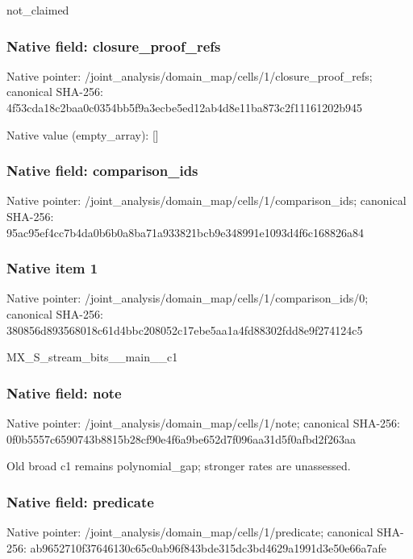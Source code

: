 \documentclass[10pt,a4paper]{article}
\begin{document}
\begingroup\raggedright\sloppy not\_\allowbreak{}claimed\par\endgroup

\subsubsection{Native field: closure\_\allowbreak{}proof\_\allowbreak{}refs}
Native pointer: /joint\_\allowbreak{}analysis/domain\_\allowbreak{}map/cells/1/closure\_\allowbreak{}proof\_\allowbreak{}refs; canonical SHA-256: 4f53cda18c2baa0c0354bb5f9a3ecbe5ed12ab4d8e11ba873c2f11161202b945

Native value (empty\_\allowbreak{}array): []

\subsubsection{Native field: comparison\_\allowbreak{}ids}
Native pointer: /joint\_\allowbreak{}analysis/domain\_\allowbreak{}map/cells/1/comparison\_\allowbreak{}ids; canonical SHA-256: 95ac95ef4cc7b4da0b6b0a8ba71a933821bcb9e348991e1093d4f6c168826a84

\subsubsection{Native item 1}
Native pointer: /joint\_\allowbreak{}analysis/domain\_\allowbreak{}map/cells/1/comparison\_\allowbreak{}ids/0; canonical SHA-256: 380856d893568018c61d4bbc208052c17ebe5aa1a4fd88302fdd8e9f274124c5

\begingroup\raggedright\sloppy MX\_\allowbreak{}S\_\allowbreak{}stream\_\allowbreak{}bits\_\allowbreak{}\_\allowbreak{}main\_\allowbreak{}\_\allowbreak{}c1\par\endgroup

\subsubsection{Native field: note}
Native pointer: /joint\_\allowbreak{}analysis/domain\_\allowbreak{}map/cells/1/note; canonical SHA-256: 0f0b5557c6590743b8815b28cf90e4f6a9be652d7f096aa31d5f0afbd2f263aa

\begingroup\raggedright\sloppy Old broad c1 remains polynomial\_\allowbreak{}gap;\allowbreak{} stronger rates are unassessed.\par\endgroup

\subsubsection{Native field: predicate}
Native pointer: /joint\_\allowbreak{}analysis/domain\_\allowbreak{}map/cells/1/predicate; canonical SHA-256: ab9652710f37646130c65c0ab96f843bde315dc3bd4629a1991d3e50e66a7afe
\end{document}
